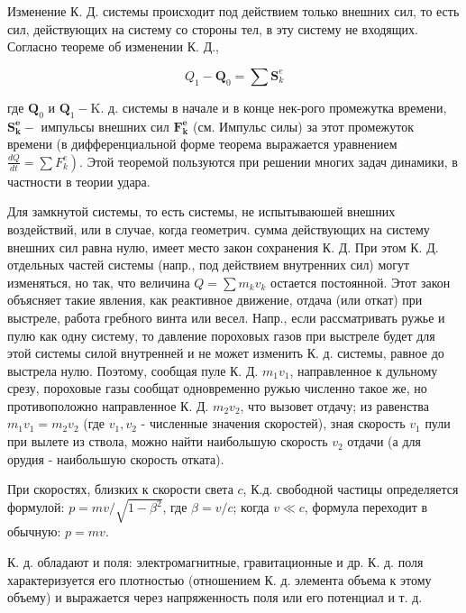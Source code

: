 \documentclass[10pt]{article}
\begin{document}
Изменение К. Д. системы происходит под действием только внешних сил, то есть сил, действующих на систему со стороны тел, в эту систему не входящих. Согласно теореме об изменении К. Д.,



\[

Q_{1}-\boldsymbol{Q}_{0}=\sum \boldsymbol{S}_{k}^{e}

\]



где $\boldsymbol{Q}_{0}$ и $\boldsymbol{Q}_{1}-\mathrm{K}$. д. системы в начале и в конце нек-рого промежутка времени, $\boldsymbol{S}_{\boldsymbol{k}}^{\boldsymbol{e}}-$ импульсы внешних сил $\boldsymbol{F}_{\boldsymbol{k}}^{\boldsymbol{e}}$ (см. Импульс силы) за этот промежуток времени (в дифференциальной форме теорема выражается уравнением $\left.\frac{d Q}{d t}=\sum F_{k}^{e}\right)$. Этой теоремой пользуются при решении многих задач динамики, в частности в теории удара.



Для замкнутой системы, то есть системы, не испытываюшей внешних воздействий, или в случае, когда геометрич. сумма действующих на систему внешних сил равна нулю, имеет место закон сохранения К. Д. При этом К. Д. отдельных частей системы (напр., под действием внутренних сил) могут изменяться, но так, что величина $Q=\sum m_{k} v_{k}$ остается постоянной. Этот закон объясняет такие явления, как реактивное движение, отдача (или откат) при выстреле, работа гребного винта или весел. Напр., если рассматривать ружье и пулю как одну систему, то давление пороховых газов при выстреле будет для этой системы силой внутренней и не может изменить К. д. системы, равное до выстрела нулю. Поэтому, сообщая пуле К. Д. $m_{1} v_{1}$, направленное к дульному срезу, пороховые газы сообщат одновременно ружью численно такое же, но противоположно направленное К. Д. $m_{2} v_{2}$, что вызовет отдачу; из равенства $m_{1} v_{1}=m_{2} v_{2}$ (где $v_{1}, v_{2}$ - численные значения скоростей), зная скорость $v_{1}$ пули при вылете из ствола, можно найти наибольшую скорость $v_{2}$ отдачи (а для орудия - наибольшую скорость отката).



При скоростях, близких к скорости света $c$, К.д. свободной частицы определяется формулой: $p=m v / \sqrt{1-\beta^{2}}$, где $\beta=v / c$; когда $v \ll c$, формула переходит в обычную: $p=m v$.



К. д. обладают и поля: электромагнитные, гравитационные и др. К. д. поля характеризуется его плотностью (отношением К. д. элемента объема к этому объему) и выражается через напряженность поля или его потенциал и т. д.
\end{document}
